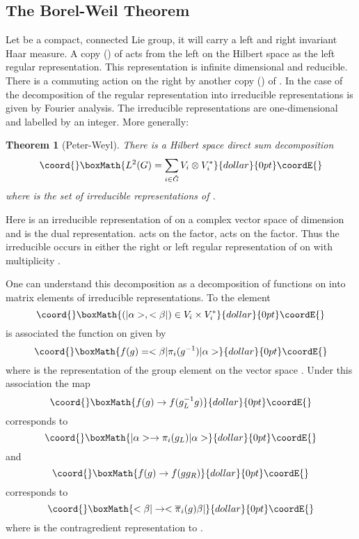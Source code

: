 \documentclass[a4paper,a4paper]{article}
\newtheorem{theorem}{Theorem}
\theoremstyle{conjecture}
\begin{document}
\subsection{The Borel-Weil Theorem}

Let \coordHE{} be a compact, connected Lie group, it will carry a left and right invariant Haar measure.  A
copy (\coordHE{}) of \coordHE{} acts from the left on the Hilbert space \coordHE{} as the left regular representation.
This representation is infinite dimensional and reducible. There is a commuting action on the right by
another copy (\coordHE{}) of \coordHE{}. In the case of \coordHE{} the decomposition of the regular representation
into irreducible representations is given by Fourier analysis. The irreducible representations are
one-dimensional and labelled by an integer. More generally:

\begin{theorem}[Peter-Weyl]
There is a
Hilbert space direct sum decomposition
$$\coord{}\boxMath{L^2(G)=\sum_{i\in \hat G}V_i\otimes V_i^*}{dollar}{0pt}\coordE{}$$
where \coordHE{} is the set of irreducible representations
of \coordHE{}.
\end{theorem}

Here \coordHE{} is an irreducible representation of \coordHE{} on a complex
vector space of dimension \coordHE{} and \coordHE{} is the dual
representation. \coordHE{} acts on the \coordHE{} factor, \coordHE{} acts on
the \coordHE{} factor.  Thus the irreducible \coordHE{} occurs in either the
right or left regular representation of \coordHE{} on \coordHE{} with
multiplicity \coordHE{}.

One can understand this decomposition as a decomposition of functions on \coordHE{} into matrix
elements of irreducible representations. To the element $$\coord{}\boxMath{(|\alpha>,<\beta|)\in V_i\times
V_i^*}{dollar}{0pt}\coordE{}$$
 is associated the function on \coordHE{}
given by $$\coord{}\boxMath{f(g)=<\beta |\pi_i(g^{-1}) |\alpha>}{dollar}{0pt}\coordE{}$$ where \coordHE{}
is the representation of the group element \coordHE{} on the vector space
\coordHE{}.  Under this association the map
$$\coord{}\boxMath{f(g)\rightarrow f(g_L^{-1}g)}{dollar}{0pt}\coordE{}$$ corresponds to
$$\coord{}\boxMath{|\alpha>\rightarrow \pi_i(g_L)|\alpha>}{dollar}{0pt}\coordE{}$$
and
$$\coord{}\boxMath{f(g)\rightarrow f(gg_R)}{dollar}{0pt}\coordE{}$$ corresponds to
$$\coord{}\boxMath{<\beta|\rightarrow <{\overline \pi}_i(g)\beta|}{dollar}{0pt}\coordE{}$$
where \coordHE{} is the contragredient representation
to \coordHE{}.
\end{document}
